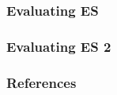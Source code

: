 \documentclass
  [hyperref={colorlinks = true,linkcolor = blue, 
             citecolor = blue, urlcolor = blue}
  ]{beamer}
\begin{document}
\begin{frame}[fragile]
  \frametitle{Evaluating ES}
\end{frame}

\begin{frame}[fragile]
  \frametitle{Evaluating ES 2}
\end{frame}




%   


\begin{frame}[fragile]
\frametitle{References}
{}
\end{frame}
\end{document}
